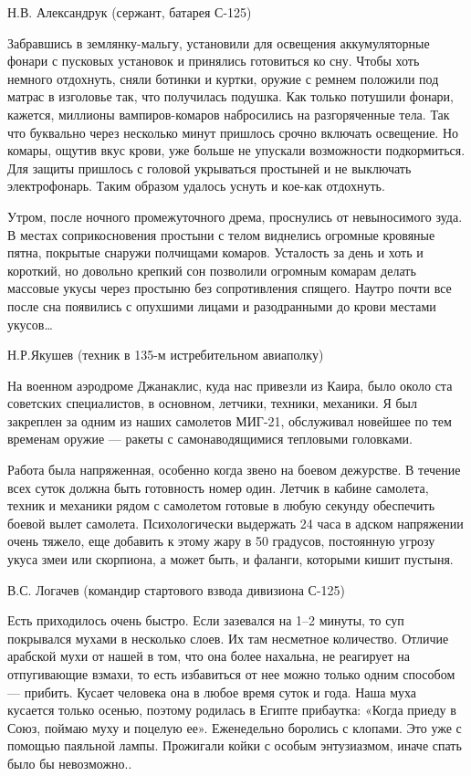 Н.В. Александрук (сержант, батарея С-125)
\begin{textcitation}
	Забравшись в землянку-мальгу, установили для освещения аккумуляторные фонари с пусковых установок и принялись готовиться ко сну. Чтобы хоть немного отдохнуть, сняли ботинки и куртки, оружие с ремнем положили под матрас в изголовье так, что получилась подушка. Как только потушили фонари, кажется, миллионы вампиров-комаров набросились на разгоряченные тела. Так что буквально через несколько минут пришлось срочно включать освещение. Но комары, ощутив вкус крови, уже больше не упускали возможности подкормиться. Для защиты пришлось с головой укрываться простыней и не выключать электрофонарь. Таким образом удалось уснуть и кое-как отдохнуть. 
	
	Утром, после ночного промежуточного дрема, проснулись от невыносимого зуда. В местах соприкосновения простыни с телом виднелись огромные кровяные пятна, покрытые снаружи полчищами комаров. Усталость за день и хоть и короткий, но довольно крепкий сон позволили огромным комарам делать массовые укусы через простыню без сопротивления спящего. Наутро почти все после сна появились с опухшими лицами и разодранными до крови местами укусов…
\end{textcitation}
Н.Р.Якушев (техник в 135-м истребительном авиаполку)

\begin{textcitation}
	На военном аэродроме Джанаклис, куда нас привезли из Каира, было около ста советских специалистов, в основном, летчики, техники, механики. Я был закреплен за одним из наших самолетов МИГ-21, обслуживал новейшее по тем временам оружие — ракеты с самонаводящимися тепловыми головками.
	
	Работа была напряженная, особенно когда звено на боевом дежурстве. В течение всех суток должна быть готовность номер один. Летчик в кабине самолета, техник и механики рядом с самолетом готовые в любую секунду обеспечить боевой вылет самолета. Психологически выдержать 24 часа в адском напряжении очень тяжело, еще добавить к этому жару в 50 градусов, постоянную угрозу укуса змеи или скорпиона, а может быть, и фаланги, которыми кишит пустыня.
\end{textcitation}

В.С. Логачев (командир стартового взвода дивизиона С-125)

\begin{textcitation}
	Есть приходилось очень быстро. Если зазевался на 1–2 минуты, то суп покрывался мухами в несколько слоев. Их там несметное количество. Отличие арабской мухи от нашей в том, что она более нахальна, не реагирует на отпугивающие взмахи, то есть избавиться от нее можно только одним способом — прибить. Кусает человека она в любое время суток и года. Наша муха кусается только осенью, поэтому родилась в Египте прибаутка: «Когда приеду в Союз, поймаю муху и поцелую ее». Еженедельно боролись с клопами. Это уже с помощью паяльной лампы. Прожигали койки с особым энтузиазмом, иначе спать было бы невозможно..
\end{textcitation}

